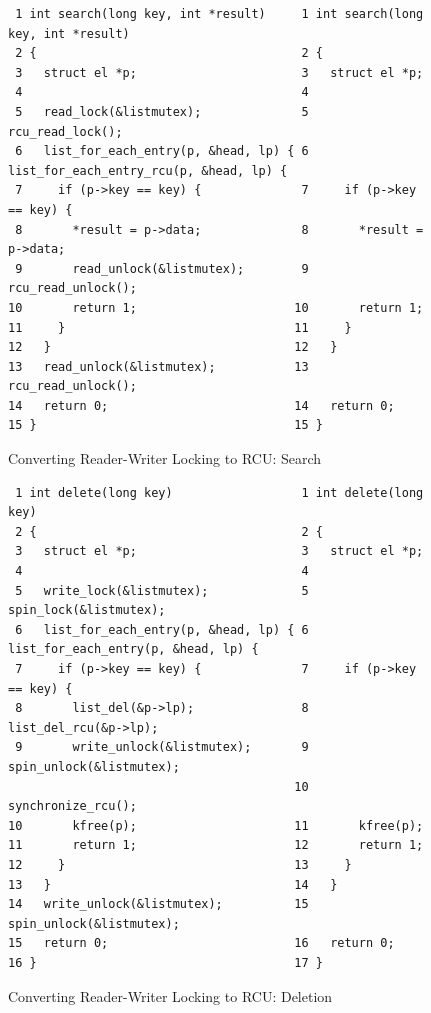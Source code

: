 \begin{figure}[htbp]
{ \scriptsize \centering
\begin{verbatim}
 1 int search(long key, int *result)     1 int search(long key, int *result)
 2 {                                     2 {
 3   struct el *p;                       3   struct el *p;
 4                                       4
 5   read_lock(&listmutex);              5   rcu_read_lock();
 6   list_for_each_entry(p, &head, lp) { 6   list_for_each_entry_rcu(p, &head, lp) {
 7     if (p->key == key) {              7     if (p->key == key) {
 8       *result = p->data;              8       *result = p->data;
 9       read_unlock(&listmutex);        9       rcu_read_unlock();
10       return 1;                      10       return 1;
11     }                                11     }
12   }                                  12   }
13   read_unlock(&listmutex);           13   rcu_read_unlock();
14   return 0;                          14   return 0;
15 }                                    15 }
\end{verbatim}
}
\caption{Converting Reader-Writer Locking to RCU: Search}
\label{fig:defer:Converting Reader-Writer Locking to RCU: Search}
\end{figure}

\begin{figure}[htbp]
{ \scriptsize \centering
\begin{verbatim}
 1 int delete(long key)                  1 int delete(long key)
 2 {                                     2 {
 3   struct el *p;                       3   struct el *p;
 4                                       4
 5   write_lock(&listmutex);             5   spin_lock(&listmutex);
 6   list_for_each_entry(p, &head, lp) { 6   list_for_each_entry(p, &head, lp) {
 7     if (p->key == key) {              7     if (p->key == key) {
 8       list_del(&p->lp);               8       list_del_rcu(&p->lp);
 9       write_unlock(&listmutex);       9       spin_unlock(&listmutex);
                                        10       synchronize_rcu();
10       kfree(p);                      11       kfree(p);
11       return 1;                      12       return 1;
12     }                                13     }
13   }                                  14   }
14   write_unlock(&listmutex);          15   spin_unlock(&listmutex);
15   return 0;                          16   return 0;
16 }                                    17 }
\end{verbatim}
}
\caption{Converting Reader-Writer Locking to RCU: Deletion}
\label{fig:defer:Converting Reader-Writer Locking to RCU: Deletion}
\end{figure}

